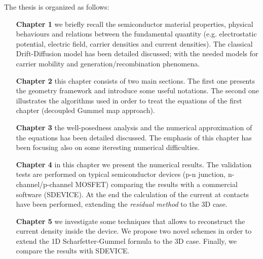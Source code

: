 The thesis is organized as follows:
\begin{itemize}[leftmargin=2.4cm]
\item[\bf Chapter 1] we briefly recall the semiconductor material properties, physical behaviours and relations between the fundamental quantity (e.g. electrostatic potential, electric field, carrier densities and current densities). The classical Drift-Diffusion model has been detailed discussed; with the needed models for carrier mobility and generation/recombination phenomena.

\item[\bf Chapter 2] this chapter consists of two main sections. The first one presents the geometry framework and introduce some useful notations. The second one illustrates the algorithms used in order to treat the equations of the first chapter (decoupled Gummel map approach).

\item[\bf Chapter 3] the well-posedness analysis and the numerical approximation of the equations has been detailed discussed. The emphasis of this chapter has been focusing also on some iteresting numerical difficulties. 

\item[\bf Chapter 4] in this chapter we present the numerical results. The validation tests are performed on typical semiconductor devices (p-n junction, n-channel/p-channel MOSFET) comparing the results with a commercial software (SDEVICE). At the end the calculation of the current at contacts have been performed, extending the \textit{residual method} \cite{ContactCurrentRM} to the 3D case.

\item[\bf Chapter 5] we investigate some techniques that allows to reconstruct the current density inside the device. We propose two novel schemes in order to extend the 1D Scharfetter-Gummel formula \cite{Gummel:SignAnalys} to the 3D case. Finally, we compare the results with SDEVICE.

\end{itemize}

